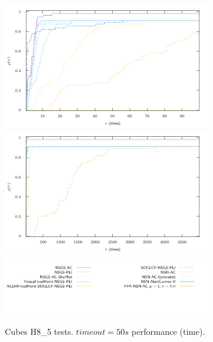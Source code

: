 \begin{figure}
  \centering
  \includegraphics[width=0.8\textwidth]{../figure/profile-LMGC_Cubes_H8_5-time_0_100.pdf}
  \includegraphics[width=0.8\textwidth]{../figure/profile-LMGC_Cubes_H8_5-time_0_5000.pdf}
  \includegraphics[width=0.8\textwidth]{../figure/profile-LMGC_Cubes_H8_5_legend-time.pdf}
  \caption{Cubes H8\_5 tests. $timeout=50s $ performance (time). }
  \label{fig:profile-LMGC_Cubes_H8_5-time}
\end{figure}

